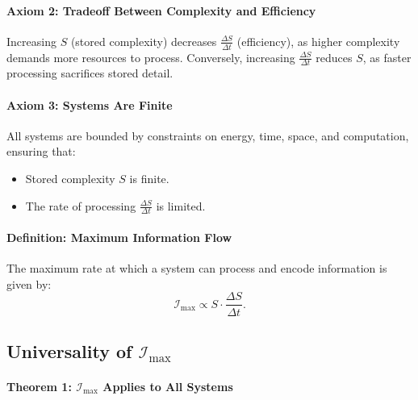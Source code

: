 \documentclass[12pt]{article}
\begin{document}
\paragraph{Axiom 2: Tradeoff Between Complexity and Efficiency}
Increasing \(S\) (stored complexity) decreases \(\frac{\Delta S}{\Delta t}\) (efficiency), as higher complexity demands more resources to process. Conversely, increasing \(\frac{\Delta S}{\Delta t}\) reduces \(S\), as faster processing sacrifices stored detail.

\paragraph{Axiom 3: Systems Are Finite}
All systems are bounded by constraints on energy, time, space, and computation, ensuring that:
\begin{itemize}
    \item Stored complexity \(S\) is finite.
    \item The rate of processing \(\frac{\Delta S}{\Delta t}\) is limited.
\end{itemize}

\paragraph{Definition: Maximum Information Flow}
The maximum rate at which a system can process and encode information is given by:
\[
\mathcal{I}_{\text{max}} \propto S \cdot \frac{\Delta S}{\Delta t}.
\]

\subsection{Universality of \(\mathcal{I}_{\text{max}}\)}

\paragraph{Theorem 1: \(\mathcal{I}_{\text{max}}\) Applies to All Systems}
\end{document}
